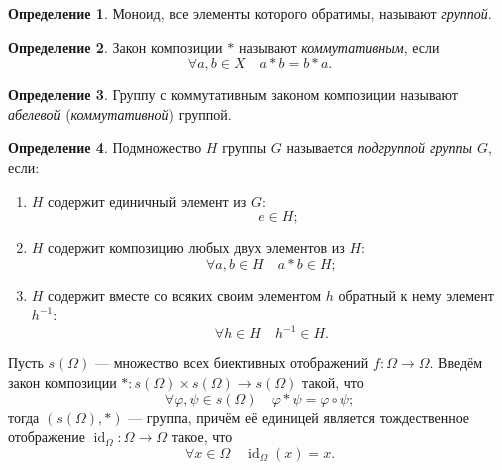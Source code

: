 \documentclass{article}
\theoremstyle{definition}
\newtheorem{definition}{Определение}[section]
\theoremstyle{plain}
\theoremstyle{remark}
\numberwithin{equation}{section}
\DeclareMathOperator{\id}{id}
\begin{document}
\begin{definition}
  Моноид, все элементы которого обратимы, называют \textit{группой}.
\end{definition}

\begin{definition}
  Закон композиции $*$ называют \textit{коммутативным}, если
  \begin{equation*}
    \forall a,b \in X \quad a * b = b * a.
  \end{equation*}
\end{definition}

\begin{definition}
  Группу с коммутативным законом композиции называют \textit{абелевой}
  (\textit{коммутативной}) группой.
\end{definition}

\begin{definition}
  Подмножество $H$ группы $G$ называется \textit{подгруппой группы $G$}, если:
  \begin{enumerate}
    \item $H$ содержит единичный элемент из $G$:
      \begin{equation*}
        \quad e \in H;
      \end{equation*}
    \item $H$ содержит композицию любых двух элементов из $H$:
      \begin{equation*}
        \forall a,b \in H \quad a * b \in H;
      \end{equation*}
    \item $H$ содержит вместе со всяких своим элементом $h$ обратный к нему
      элемент $h^{-1}$:
      \begin{equation*}
        \forall h \in H \quad h^{-1} \in H.
      \end{equation*}
  \end{enumerate}
\end{definition}

Пусть $s(\Omega)$ --- множество всех биективных отображений $f : \Omega \to
\Omega$. Введём закон композиции $* : s(\Omega) \times s(\Omega) \to s(\Omega)$
такой, что
\begin{equation*}
  \forall \varphi, \psi \in s(\Omega) \quad \varphi * \psi = \varphi \circ \psi;
\end{equation*}
тогда $(s(\Omega), *)$ --- группа, причём её единицей является тождественное
отображение $\id_\Omega: \Omega \to \Omega$ такое, что
\begin{equation*}
  \forall x \in \Omega \quad \id_\Omega(x) = x.
\end{equation*}
\end{document}
